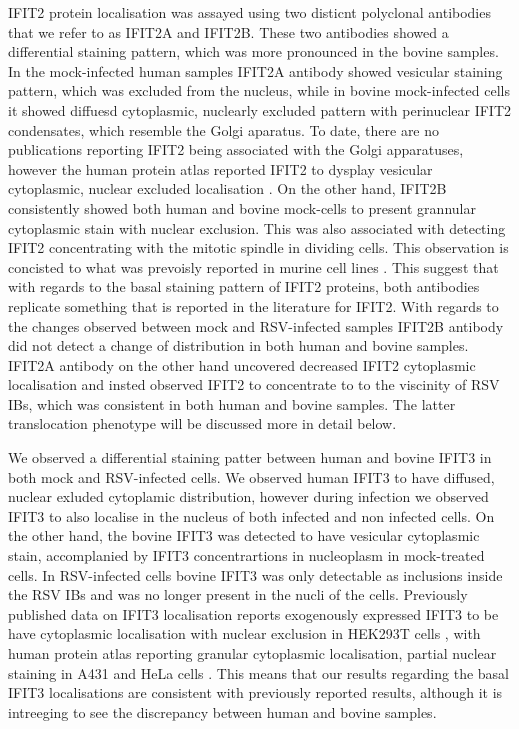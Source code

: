 IFIT2 protein localisation was assayed using two disticnt polyclonal antibodies that we refer to as IFIT2A and IFIT2B. These two antibodies showed a differential staining pattern, which was more pronounced in the bovine samples. In the mock-infected human samples IFIT2A antibody showed vesicular staining pattern, which was excluded from the nucleus, while in bovine mock-infected cells it showed diffuesd cytoplasmic, nuclearly excluded pattern with perinuclear IFIT2 condensates, which resemble the Golgi aparatus. To date, there are no publications reporting IFIT2 being associated with the Golgi apparatuses, however the human protein atlas reported IFIT2 to dysplay vesicular cytoplasmic, nuclear excluded localisation \cite{Thul2017AProteome}. On the other hand, IFIT2B consistently showed both human and bovine mock-cells to present grannular cytoplasmic stain with nuclear exclusion. This was also associated with detecting IFIT2 concentrating with the mitotic spindle in dividing cells. This observation is concisted to what was prevoisly reported in murine cell lines \cite{Saha2006IdentificationProtein}. This suggest that with regards to the basal staining pattern of IFIT2 proteins, both antibodies replicate something that is reported in the literature for IFIT2. With regards to the changes observed between mock and RSV-infected samples IFIT2B antibody did not detect a change of distribution in both human and bovine samples. IFIT2A antibody on the other hand uncovered decreased IFIT2 cytoplasmic localisation and insted observed IFIT2 to concentrate to to the viscinity of RSV IBs, which was consistent in both human and bovine samples. The latter translocation phenotype will be discussed more in detail below.

We observed a differential staining patter between human and bovine IFIT3 in both mock and RSV-infected cells. We observed human IFIT3 to have diffused, nuclear exluded cytoplamic distribution, however during infection we observed IFIT3 to also localise in the nucleus of both infected and non infected cells. On the other hand, the bovine IFIT3 was detected to have vesicular cytoplasmic stain, accomplanied by IFIT3 concentrartions in nucleoplasm in mock-treated cells. In RSV-infected cells bovine  IFIT3 was only detectable as inclusions inside the RSV IBs and was no longer present in the nucli of the cells. Previously published data on IFIT3 localisation reports exogenously expressed IFIT3 to be have cytoplasmic localisation with nuclear exclusion in HEK293T cells \cite{Huang2008Interferon-inducedCells, Liu2011IFN-InducedTBK1}, with human protein atlas reporting granular cytoplasmic localisation, partial nuclear staining in A431 and HeLa cells \cite{Thul2017AProteome}. This means that our results regarding the basal IFIT3 localisations are consistent with previously reported results, although it is intreeging to see the discrepancy between human and bovine samples.

